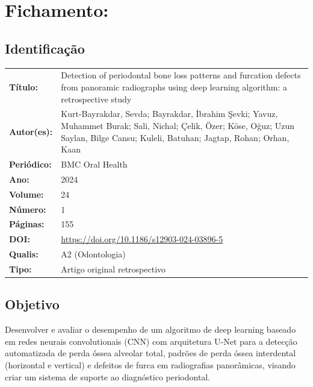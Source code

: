 \section{Fichamento: }

\subsection{Identificação}
\begin{tabular}{ll}
\textbf{Título:} & Detection of periodontal bone loss patterns and furcation
defects from panoramic radiographs using deep learning algorithm:
a retrospective study \\
\textbf{Autor(es):} & Kurt-Bayrakdar, Sevda; Bayrakdar, İbrahim Şevki;
Yavuz, Muhammet Burak; Sali, Nichal; Çelik, Özer; Köse, Oğuz; Uzun Saylan,
Bilge Cansu; Kuleli, Batuhan; Jagtap, Rohan; Orhan, Kaan \\
\textbf{Periódico:} & BMC Oral Health \\
\textbf{Ano:} & 2024 \\
\textbf{Volume:} & 24 \\
\textbf{Número:} & 1 \\
\textbf{Páginas:} & 155 \\
\textbf{DOI:} & \url{https://doi.org/10.1186/s12903-024-03896-5} \\
\textbf{Qualis:} & A2 (Odontologia) \\
\textbf{Tipo:} & Artigo original retrospectivo \\
\end{tabular}

\subsection{Objetivo}
Desenvolver e avaliar o desempenho de um algoritmo de deep learning baseado
em redes neurais convolutionais (CNN) com arquitetura U-Net para a detecção
automatizada de perda óssea alveolar total, padrões de perda óssea
interdental (horizontal e vertical) e defeitos de furca em radiografias
panorâmicas, visando criar um sistema de suporte ao diagnóstico
periodontal.

